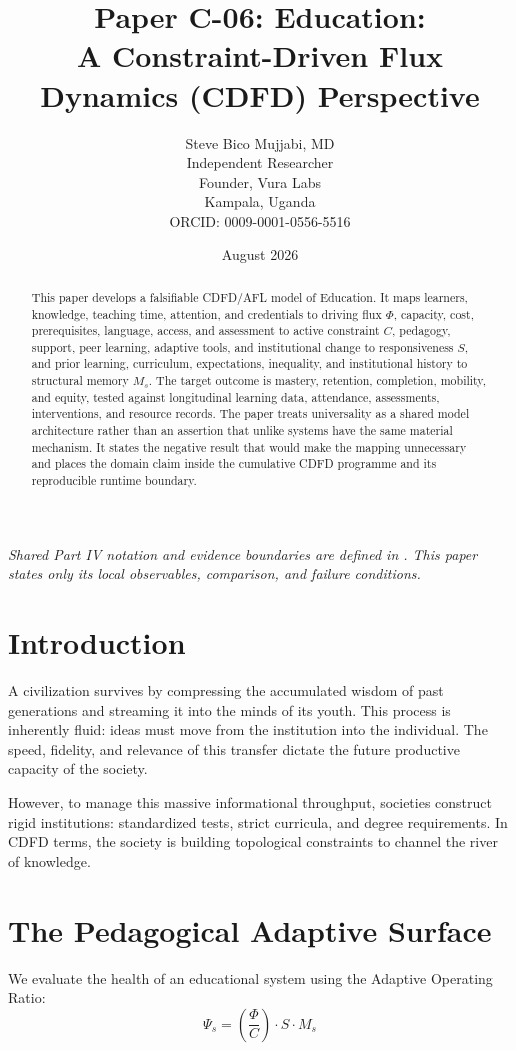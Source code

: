 \documentclass[11pt,a4paper]{article}
\title{\textbf{Paper C-06: Education:\\ A Constraint-Driven Flux Dynamics (CDFD) Perspective}}
\author{Steve Bico Mujjabi, MD\\
\small Independent Researcher\\
\small Founder, Vura Labs\\
\small Kampala, Uganda\\
\small ORCID: 0009-0001-0556-5516}
\date{August 2026}
\begin{document}
\maketitle

\noindent\textit{Shared Part IV notation and evidence boundaries are defined in . This paper states only its local observables, comparison, and failure conditions.}


\begin{abstract}
This paper develops a falsifiable CDFD/AFL model of Education. It maps learners, knowledge, teaching time, attention, and credentials to driving flux $\Phi$, capacity, cost, prerequisites, language, access, and assessment to active constraint $C$, pedagogy, support, peer learning, adaptive tools, and institutional change to responsiveness $S$, and prior learning, curriculum, expectations, inequality, and institutional history to structural memory $M_s$. The target outcome is mastery, retention, completion, mobility, and equity, tested against longitudinal learning data, attendance, assessments, interventions, and resource records. The paper treats universality as a shared model architecture rather than an assertion that unlike systems have the same material mechanism. It states the negative result that would make the mapping unnecessary and places the domain claim inside the cumulative CDFD programme and its reproducible runtime boundary.
\end{abstract}

\section{Introduction}

A civilization survives by compressing the accumulated wisdom of past generations and streaming it into the minds of its youth. This process is inherently fluid: ideas must move from the institution into the individual. The speed, fidelity, and relevance of this transfer dictate the future productive capacity of the society.

However, to manage this massive informational throughput, societies construct rigid institutions: standardized tests, strict curricula, and degree requirements. In CDFD terms, the society is building topological constraints to channel the river of knowledge.

\section{The Pedagogical Adaptive Surface}
We evaluate the health of an educational system using the Adaptive Operating Ratio:
\begin{equation}
    \Psi_s = \left( \frac{\Phi}{C} \right) \cdot S \cdot M_s
\end{equation}
\end{document}
